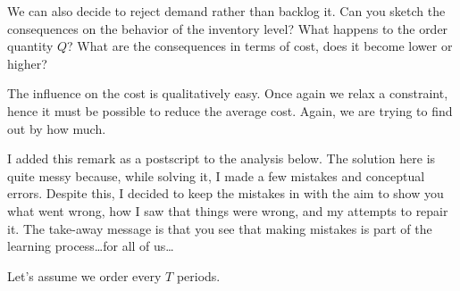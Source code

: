 \begin{question}We can also decide to reject demand rather than
  backlog it. Can you sketch the consequences on the behavior of the
  inventory level?  What happens to the order quantity $Q$?  What are
  the consequences in terms of cost, does it become lower or higher?
  \begin{solution}
    The influence on the cost is qualitatively easy. Once again we
    relax a constraint, hence it must be possible to reduce the
    average cost. Again, we are trying to find out by how much. 

    \begin{remark}
      I added this remark as a postscript to the analysis below. The
      solution here is quite messy because, while solving it, I made a
      few mistakes and conceptual errors. Despite this, I decided to
      keep the mistakes in with the aim to show you what went wrong,
      how I saw that things were wrong, and my attempts to repair
      it. The take-away message is that you see that making mistakes
      is part of the learning process\ldots for all of us\ldots
    \end{remark}

    Let's assume we order every $T$ periods.

\begin{center}
\end{center}
\end{solution}
\end{question}
